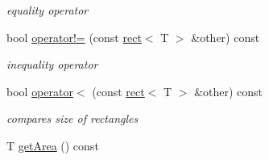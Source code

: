 \begin{DoxyCompactItemize}
\begin{DoxyCompactList}\small\item\em equality operator \end{DoxyCompactList}\item 
bool \hyperlink{classirr_1_1core_1_1rect_a68e23478fc9788779820988f106b9fd2}{operator!=} (const \hyperlink{classirr_1_1core_1_1rect}{rect}$<$ T $>$ \&other) const \hypertarget{classirr_1_1core_1_1rect_a68e23478fc9788779820988f106b9fd2}{}\label{classirr_1_1core_1_1rect_a68e23478fc9788779820988f106b9fd2}

\begin{DoxyCompactList}\small\item\em inequality operator \end{DoxyCompactList}\item 
bool \hyperlink{classirr_1_1core_1_1rect_abcba5b76777333253cd37ed041e7c3a7}{operator$<$} (const \hyperlink{classirr_1_1core_1_1rect}{rect}$<$ T $>$ \&other) const \hypertarget{classirr_1_1core_1_1rect_abcba5b76777333253cd37ed041e7c3a7}{}\label{classirr_1_1core_1_1rect_abcba5b76777333253cd37ed041e7c3a7}

\begin{DoxyCompactList}\small\item\em compares size of rectangles \end{DoxyCompactList}\item 
T \hyperlink{classirr_1_1core_1_1rect_aec261cb39303c6051faf8202741f2b53}{get\+Area} () const \hypertarget{classirr_1_1core_1_1rect_aec261cb39303c6051faf8202741f2b53}{}\label{classirr_1_1core_1_1rect_aec261cb39303c6051faf8202741f2b53}


\end{DoxyCompactItemize}
